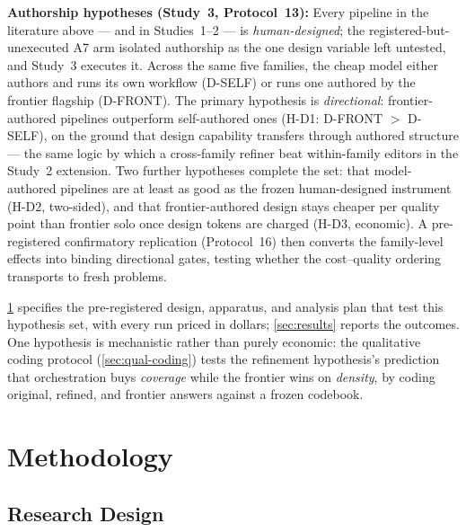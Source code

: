 \documentclass[12pt,a4paper]{article}
\begin{document}
\medskip
\noindent\textbf{Authorship hypotheses (Study~3, Protocol~13):} Every pipeline
in the literature above --- and in Studies~1--2 --- is \emph{human-designed};
the registered-but-unexecuted A7 arm isolated authorship as the one design
variable left untested, and Study~3 executes it. Across the same five families,
the cheap model either authors and runs its own workflow (D-SELF) or runs one
authored by the frontier flagship (D-FRONT). The primary hypothesis is
\emph{directional}: frontier-authored pipelines outperform self-authored ones
(H-D1: D-FRONT $>$ D-SELF), on the ground that design capability transfers
through authored structure --- the same logic by which a cross-family refiner
beat within-family editors in the Study~2 extension. Two further hypotheses complete the set:
that model-authored pipelines are at least as good as the frozen human-designed
instrument (H-D2, two-sided), and that frontier-authored design stays cheaper
per quality point than frontier solo once design tokens are charged (H-D3,
economic). A pre-registered confirmatory replication (Protocol~16) then converts
the family-level effects into binding directional gates, testing whether the
cost--quality ordering transports to fresh problems.

\cref{sec:method} specifies the pre-registered design, apparatus, and analysis
plan that test this hypothesis set, with every run priced in dollars;
\cref{sec:results} reports the outcomes. One hypothesis is mechanistic rather
than purely economic: the qualitative coding protocol (\cref{sec:qual-coding})
tests the refinement hypothesis's prediction that orchestration buys
\emph{coverage} while the frontier wins on \emph{density}, by coding original,
refined, and frontier answers against a frozen codebook.



\section{Methodology}\label{sec:method}

\subsection{Research Design}
\end{document}
